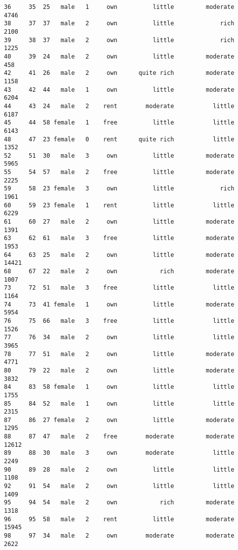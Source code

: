 \documentclass[
]{article}
\begin{document}
\begin{verbatim}
36     35  25   male   1     own          little         moderate          4746
38     37  37   male   2     own          little             rich          2100
39     38  37   male   2     own          little             rich          1225
40     39  24   male   2     own          little         moderate           458
42     41  26   male   2     own      quite rich         moderate          1158
43     42  44   male   1     own          little         moderate          6204
44     43  24   male   2    rent        moderate           little          6187
45     44  58 female   1    free          little           little          6143
48     47  23 female   0    rent      quite rich           little          1352
52     51  30   male   3     own          little         moderate          5965
55     54  57   male   2    free          little         moderate          2225
59     58  23 female   3     own          little             rich          1961
60     59  23 female   1    rent          little           little          6229
61     60  27   male   2     own          little         moderate          1391
63     62  61   male   3    free          little         moderate          1953
64     63  25   male   2     own          little         moderate         14421
68     67  22   male   2     own            rich         moderate          1007
73     72  51   male   3    free          little           little          1164
74     73  41 female   1     own          little         moderate          5954
76     75  66   male   3    free          little           little          1526
77     76  34   male   2     own          little           little          3965
78     77  51   male   2     own          little         moderate          4771
80     79  22   male   2     own          little         moderate          3832
84     83  58 female   1     own          little           little          1755
85     84  52   male   1     own          little           little          2315
87     86  27 female   2     own          little         moderate          1295
88     87  47   male   2    free        moderate         moderate         12612
89     88  30   male   3     own        moderate           little          2249
90     89  28   male   2     own          little           little          1108
92     91  54   male   2     own          little           little          1409
95     94  54   male   2     own            rich         moderate          1318
96     95  58   male   2    rent          little         moderate         15945
98     97  34   male   2     own        moderate         moderate          2622

\end{verbatim}
\end{document}
